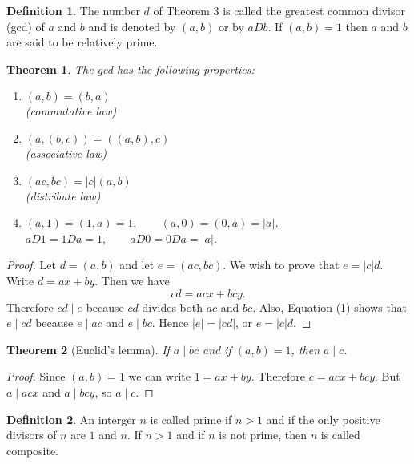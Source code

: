 \documentclass[11pt]{article}
\newtheorem{theorem}{Theorem}
\theoremstyle{definition}
\newtheorem*{defn}{Definition}
\begin{document}
\begin{defn}
  The number \(d\) of Theorem 3 is called the greatest common divisor (gcd) of \(a\) and \(b\) and is denoted by \((a,b)\) or by
  \(aDb\). If \((a,b) = 1\) then \(a\) and \(b\) are said to be relatively prime.
\end{defn}


\begin{theorem}
  The gcd has the following properties:
  \begin{enumerate}
  \item \((a,b) = (b,a)\)\\
     (commutative law)
  \item \((a,(b,c)) = ((a,b),c)\)\\
     (associative law)
  \item \((ac,bc) = |c|(a,b)\)\\
     (distribute law)
  \item \((a,1) = (1,a) = 1, \qquad (a,0) = (0,a) = |a|\).\\
    \(aD1 = 1Da = 1, \qquad aD0 = 0Da = |a|\).
  \end{enumerate}
\end{theorem}

\begin{proof}
  Let \(d = (a, b)\) and let \(e = (ac, bc)\). We wish to prove that \(e = |c|d\). Write
  \(d = ax + by\). Then we have
  \begin{equation}
    cd = acx + bcy.
  \end{equation}
  Therefore \(cd \mid e\) because \(cd\) divides both \(ac\) and \(bc\). Also,  Equation (1) shows
  that \(e \mid cd\) because \(e \mid ac\) and \(e \mid bc\). Hence \(|e| = |cd|\), or \(e = |c|d\).
\end{proof}

\begin{theorem}[Euclid's lemma]
  If \(a \mid bc\) and if \((a,b) = 1\), then \(a \mid c\).
\end{theorem}

\begin{proof}
  Since \((a,b) = 1\) we can write \(1 = ax + by\). Therefore \(c = acx + bcy\).
  But \(a \mid acx\) and \(a \mid bcy\), so \(a \mid c\).
\end{proof}

\begin{defn}
  An interger \(n\) is called prime if \(n > 1\) and if the only positive
  divisors of \(n\) are \(1\) and \(n\). If \(n > 1\) and if \(n\) is not prime,
  then \(n\) is called composite.
\end{defn}
\end{document}
